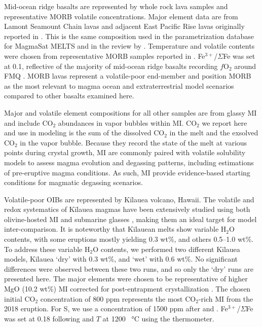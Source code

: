 \documentclass[draft, english]{volcanica-template}
\begin{document}
Mid-ocean ridge basalts are represented by whole rock lava samples and representative MORB volatile concentrations. Major element data are from Lamont Seamount Chain lavas and adjacent East Pacific Rise lavas originally reported in \textcite{Allan1989}. This is the same composition used in the parametrization database for MagmaSat MELTS \parencite{GhiorsoGualda2015} and in the review by \textcite{WieserVESIcal2022}. Temperature and volatile contents were chosen from representative MORB samples reported in \textcite{cottrell2021morb}. Fe$^{3+}$/$\Sigma$Fe was set at 0.1, reflective of the majority of mid-ocean ridge basalts recording $f$O$_2$ around FMQ \parencite{cottrell2021morb}. MORB lavas represent a volatile-poor end-member and position MORB as the most relevant to magma ocean and extraterrestrial model scenarios compared to other basalts examined here. 

Major and volatile element compositions for all other samples are from glassy MI and include CO$_2$ abundances in vapor bubbles within MI. CO$_2$ we report here and use in modeling is the sum of the dissolved CO$_2$ in the melt and the exsolved CO$_2$ in the vapor bubble. Because they record the state of the melt at various points during crystal growth, MI are commonly paired with volatile solubility models to assess magma evolution and degassing patterns, including estimations of pre-eruptive magma conditions. As such, MI provide evidence-based starting conditions for magmatic degassing scenarios.

Volatile-poor OIBs are represented by Kīlauea volcano, Hawai{\okina}i. The volatile and redox systematics of Kīlauea magmas have been extensively studied using both olivine-hosted MI \parencite{sides2014magma, wieser2021reconstructing, lerner2021petrologic, moore2015bubbles, lerner2021improving, moussallam2016impact, tucker2019high} and submarine glasses \parencite{dixon1991degassing, clague1995petrology}, making them an ideal target for model inter-comparison. It is noteworthy that Kīlauean melts show variable H$_2$O contents, with some eruptions mostly yielding 0.3 wt\%, and others 0.5--1.0 wt\%. To address these variable H$_2$O contents, we performed two different Kīlauea models, Kīlauea `dry' with 0.3 wt\%, and `wet' with 0.6 wt\%. No significant differences were observed between these two runs, and so only the `dry' runs are presented here. The major elements were chosen to be representative of higher MgO (10.2 wt\%) MI corrected for post-entrapment crystallization \parencite{wieser2020chalcophile, wieser2021reconstructing, lerner2021improving}. The chosen initial CO$_2$ concentration of 800 ppm represents the most CO$_2$-rich MI from the 2018 eruption. For S, we use a concentration of 1500 ppm after \textcite{wieser2020chalcophile} and \textcite{sides2014magma}. Fe$^{3+}$/$\Sigma$Fe was set at 0.18 following \textcite{lerner2021petrologic} and $T$ at 1200 \SI{}{\celsius} using the \textcite{helz1987geothermometry} thermometer. 
\end{document}
